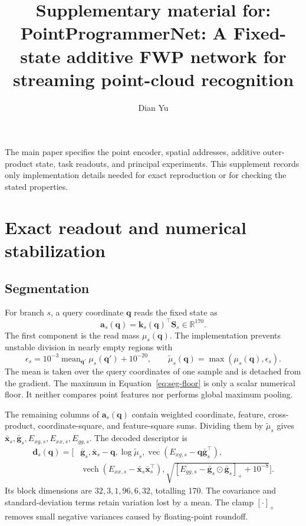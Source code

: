 \documentclass[review,12pt,authoryear]{elsarticle}
\newcommand{\R}{\mathbb{R}}
\newcommand{\Sstate}{\mathbf{S}}
\newcommand{\vect}{\operatorname{vec}}
\begin{document}
\begin{frontmatter}
\title{Supplementary material for: PointProgrammerNet: A Fixed-state additive FWP network for streaming point-cloud recognition}
\author[a]{Dian Yu}
\address[a]{University of New South Wales, Sydney, NSW 2052, Australia}
\end{frontmatter}

The main paper specifies the point encoder, spatial addresses, additive outer-product state, task readouts, and principal experiments. This supplement records only implementation details needed for exact reproduction or for checking the stated properties.

\section{Exact readout and numerical stabilization}

\subsection{Segmentation}

For branch \(s\), a query coordinate \(\bm q\) reads the fixed state as
\[
\bm a_s(\bm q)=\bm k_s(\bm q)^\top\Sstate_s\in\R^{170}.
\]
The first component is the read mass \(\mu_s(\bm q)\). The implementation prevents unstable division in nearly empty regions with
\begin{equation}
\epsilon_s=10^{-3}\operatorname{mean}_{\bm q'}\mu_s(\bm q')+10^{-20},
\qquad
\widetilde\mu_s(\bm q)=\max(\mu_s(\bm q),\epsilon_s).
\label{eq:seg-floor}
\end{equation}
The mean is taken over the query coordinates of one sample and is detached from the gradient. The maximum in Equation~\eqref{eq:seg-floor} is only a scalar numerical floor. It neither compares point features nor performs global maximum pooling.

The remaining columns of \(\bm a_s(\bm q)\) contain weighted coordinate, feature, cross-product, coordinate-square, and feature-square sums. Dividing them by \(\widetilde\mu_s\) gives \(\bar{\bm x}_s,\bar{\bm g}_s,E_{xg,s},E_{xx,s},E_{gg,s}\). The decoded descriptor is
\begin{equation}
\begin{aligned}
\bm d_s(\bm q)=[&\bar{\bm g}_s,\bar{\bm x}_s-\bm q,\log\widetilde\mu_s,
\vect(E_{xg,s}-\bm q\bar{\bm g}_s^\top),\\
&\operatorname{vech}(E_{xx,s}-\bar{\bm x}_s\bar{\bm x}_s^\top),
\sqrt{[E_{gg,s}-\bar{\bm g}_s\odot\bar{\bm g}_s]_++10^{-8}}].
\end{aligned}
\label{eq:seg-descriptor}
\end{equation}
Its block dimensions are \(32,3,1,96,6,32\), totalling 170. The covariance and standard-deviation terms retain variation lost by a mean. The clamp \([\cdot]_+\) removes small negative variances caused by floating-point roundoff.
\end{document}
